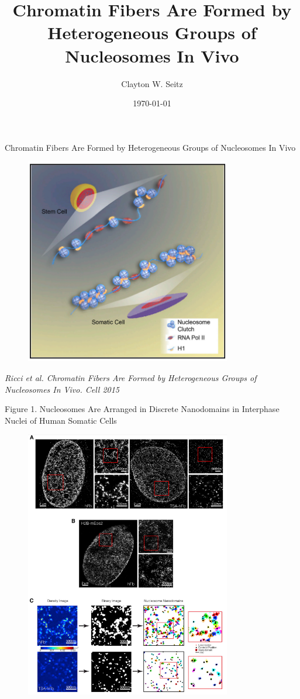 \documentclass{beamer}			%
\title{Chromatin Fibers Are Formed by Heterogeneous Groups of Nucleosomes In Vivo}	%
\author{Clayton W. Seitz}								%
\date{\today}									%
\begin{document}
\begin{frame}
  \titlepage
\end{frame}


%

\begin{frame}{Chromatin Fibers Are Formed by Heterogeneous Groups of Nucleosomes In Vivo}
\begin{figure}
\includegraphics[width=9cm]{Abstract.png}
\end{figure}
\textit{Ricci et al. Chromatin Fibers Are Formed by Heterogeneous Groups of Nucleosomes In Vivo. Cell 2015}
\end{frame}

\begin{frame}{Figure 1. Nucleosomes Are Arranged in Discrete Nanodomains in Interphase Nuclei of Human Somatic Cells}
\begin{figure}
\includegraphics[width=9cm]{Figure-1.png}
\end{figure}
\end{frame}
\end{document}
